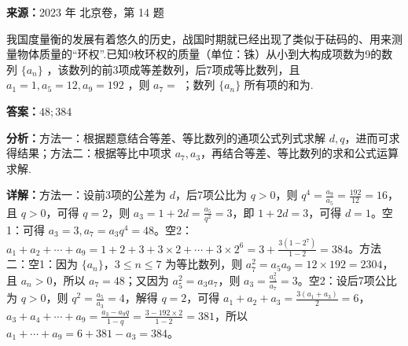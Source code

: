 \begin{question}[points=5]
\textbf{来源：}2023 年 北京卷，第 14 题\par
我国度量衡的发展有着悠久的历史，战国时期就已经出现了类似于砝码的、用来测量物体质量的“环权”.已知9枚环权的质量（单位：铢）从小到大构成项数为9的数列 $\{a_n\}$ ，该数列的前3项成等差数列，后7项成等比数列，且 $a_1=1, a_5=12, a_9=192$ ，则 $a_7=$ ；数列 $\{a_n\}$ 所有项的和为.
\fillin[{$48 ; 384$}]
\begin{solution}
\textbf{答案：}$48 ; 384$

\textbf{分析：}方法一：根据题意结合等差、等比数列的通项公式列式求解 $d,q$，进而可求得结果；方法二：根据等比中项求 $a_7,a_3$，再结合等差、等比数列的求和公式运算求解.

\textbf{详解：}方法一：设前3项的公差为 $d$，后7项公比为 $q>0$，则 $q^4=\frac{a_9}{a_5}=\frac{192}{12}=16$，且 $q>0$，可得 $q=2$，则 $a_3=1+2d=\frac{a_5}{q^2}=3$，即 $1+2d=3$，可得 $d=1$。空1：可得 $a_3=3, a_7=a_3q^4=48$。空2：$a_1+a_2+\cdots+a_9=1+2+3+3\times2+\cdots+3\times2^6=3+\frac{3(1-2^7)}{1-2}=384$。方法二：空1：因为 $\{a_n\}$，$3\le n\le 7$ 为等比数列，则 $a_7^2=a_5a_9=12\times192=2304$，且 $a_n>0$，所以 $a_7=48$；又因为 $a_5^2=a_3a_7$，则 $a_3=\frac{a_5^2}{a_7}=3$。空2：设后7项公比为 $q>0$，则 $q^2=\frac{a_5}{a_3}=4$，解得 $q=2$，可得 $a_1+a_2+a_3=\frac{3(a_1+a_3)}{2}=6$，$a_3+a_4+\cdots+a_9=\frac{a_3-a_9q}{1-q}=\frac{3-192\times2}{1-2}=381$，所以 $a_1+\cdots+a_9=6+381-a_3=384$。
\end{solution}
\end{question}


